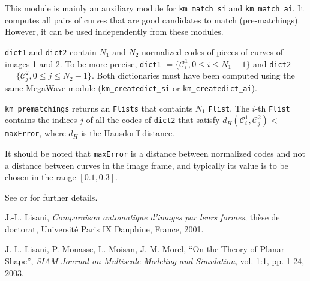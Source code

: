 This module is mainly an auxiliary module for
\verb+km_match_si+ and \verb+km_match_ai+. It
computes all pairs of curves that are good candidates to match
(pre-matchings). However, it can be used independently from
these modules.

\verb+dict1+ and \verb+dict2+ contain $N_1$ and $N_2$ normalized codes
of pieces of curves of images 1 and 2. To be more precise,
\verb+dict1+ $=\{{\mathcal C}^1_i, 0 \leq i \leq N_1-1 \}$ and
\verb+dict2+ $=\{{\mathcal C}^2_j, 0 \leq j \leq N_2-1 \}$.  Both
dictionaries must have been computed using the same MegaWave module
(\verb+km_createdict_si+ or \verb+km_createdict_ai+).

\verb+km_prematchings+ returns an \verb+Flists+ that containts $N_1$
\verb+Flist+. The $i$-th \verb+Flist+ contains the indices $j$ of all
the codes of \verb+dict2+ that satisfy $d_H({\mathcal C}^1_i,{\mathcal
  C}^2_j) < $ \verb+maxError+, where $d_H$ is the Hausdorff distance. 

It should be noted that \verb+maxError+ is a distance between
normalized codes and not a distance between curves in the image frame,
and typically its value is to be chosen in the range $[0.1,0.3]$.

\bigskip
See \cite{joseluis} or \cite{LMMM} for further details.


\begin{thebibliography}{9}

 J.-L. {\sc Lisani}, {\it Comparaison automatique
d'images par leurs formes}, th\`ese de doctorat, Universit\'e Paris IX
Dauphine, France, 2001.

 J.-L. Lisani, P. Monasse, L. Moisan, J.-M. Morel, 
``On the Theory of Planar Shape'', 
{\it SIAM Journal on Multiscale Modeling and Simulation}, 
vol. 1:1, pp. 1-24, 2003. 

\end{thebibliography}
